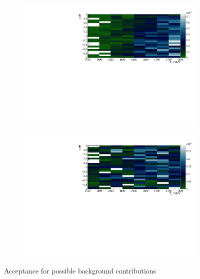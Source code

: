 \begin{figure}[htbp]
	\centering
	\begin{subfigure}{\linewidth}
			\includegraphics[width=\linewidth]{../figs/hydrogen/acceptance_2pi0.pdf}
	\end{subfigure}
\begin{subfigure}{\linewidth}
		\includegraphics[width=\linewidth]{../figs/hydrogen/acceptance_pi0eta.pdf}
\end{subfigure}
\caption{Acceptance for possible background contributions}
\label{fig:acc_bkg}
\end{figure}

